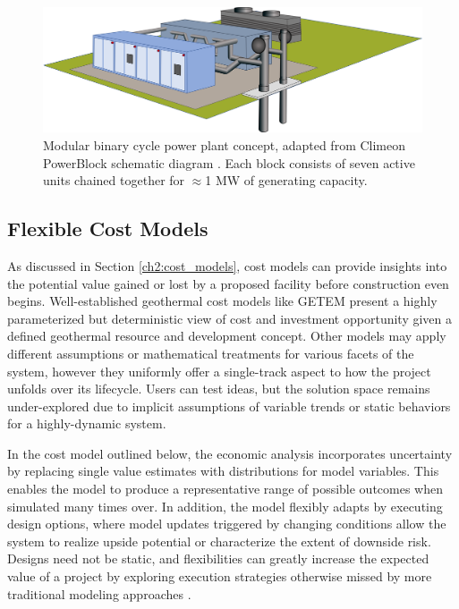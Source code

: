 \begin{figure}[!htp]
\centering
\includegraphics[width=\textwidth]{templates/images/Figure-Climeon-PowerBlock.png}
\caption[Modular power plant schematic]{Modular binary cycle power plant concept, adapted from Climeon PowerBlock schematic diagram \protect\citep{climeon_climeon_2021-1}. Each block consists of seven active units chained together for $\approx$1 MW of generating capacity.}
\label{fig:climeon_powerblock}
\end{figure}

\subsection{Flexible Cost Models}\label{ch4:flex_models}
As discussed in Section \ref{ch2:cost_models}, cost models can provide insights into the potential value gained or lost by a proposed facility before construction even begins. Well-established geothermal cost models like GETEM \citep{entingh_volume_2006} present a highly parameterized but deterministic view of cost and investment opportunity given a defined geothermal resource and development concept. Other models may apply different assumptions or mathematical treatments for various facets of the system, however they uniformly offer a single-track aspect to how the project unfolds over its lifecycle. Users can test ideas, but the solution space remains under-explored due to implicit assumptions of variable trends or static behaviors for a highly-dynamic system.

In the cost model outlined below, the economic analysis incorporates uncertainty by replacing single value estimates with distributions for model variables. This enables the model to produce a representative range of possible outcomes when simulated many times over. In addition, the model flexibly adapts by executing design options, where model updates triggered by changing conditions allow the system to realize upside potential or characterize the extent of downside risk. Designs need not be static, and flexibilities can greatly increase the expected value of a project by exploring execution strategies otherwise missed by more traditional modeling approaches \citep[Chapter 6]{de_neufville_flexibility_2011}.

